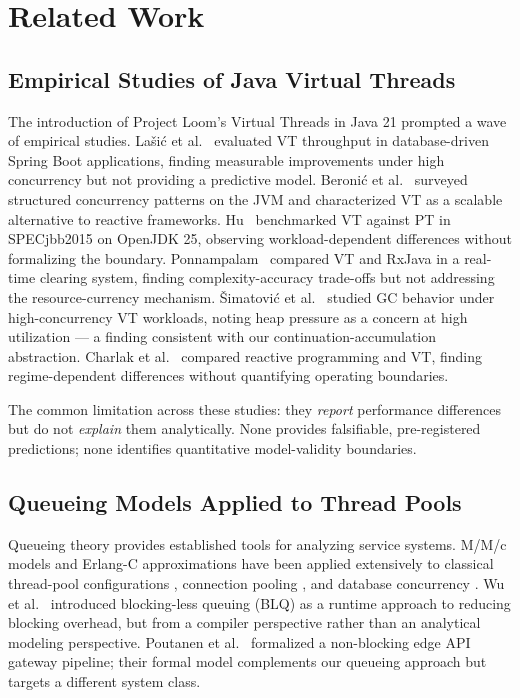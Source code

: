 \documentclass[10pt]{article}
\begin{document}
\section{Related Work}

\subsection{Empirical Studies of Java Virtual Threads}

The introduction of Project Loom's Virtual Threads in Java 21 prompted a wave of empirical studies. Lašić et al.~\cite{lasic2024} evaluated VT throughput in database-driven Spring Boot applications, finding measurable improvements under high concurrency but not providing a predictive model. Beronić et al.~\cite{beronic2024} surveyed structured concurrency patterns on the JVM and characterized VT as a scalable alternative to reactive frameworks. Hu~\cite{hu2026} benchmarked VT against PT in SPECjbb2015 on OpenJDK 25, observing workload-dependent differences without formalizing the boundary. Ponnampalam~\cite{ponnampalam2025} compared VT and RxJava in a real-time clearing system, finding complexity-accuracy trade-offs but not addressing the resource-currency mechanism. Šimatović et al.~\cite{simatovic2025} studied GC behavior under high-concurrency VT workloads, noting heap pressure as a concern at high utilization --- a finding consistent with our continuation-accumulation abstraction. Charlak et al.~\cite{charlak2026} compared reactive programming and VT, finding regime-dependent differences without quantifying operating boundaries.

The common limitation across these studies: they \emph{report} performance differences but do not \emph{explain} them analytically. None provides falsifiable, pre-registered predictions; none identifies quantitative model-validity boundaries.

\subsection{Queueing Models Applied to Thread Pools}

Queueing theory provides established tools for analyzing service systems. M/M/c models and Erlang-C approximations have been applied extensively to classical thread-pool configurations \cite{pereira2025}, connection pooling \cite{chernyshahar2025}, and database concurrency \cite{phan2025}. Wu et al.~\cite{wu2024} introduced blocking-less queuing (BLQ) as a runtime approach to reducing blocking overhead, but from a compiler perspective rather than an analytical modeling perspective. Poutanen et al.~\cite{poutanen2026} formalized a non-blocking edge API gateway pipeline; their formal model complements our queueing approach but targets a different system class.
\end{document}
